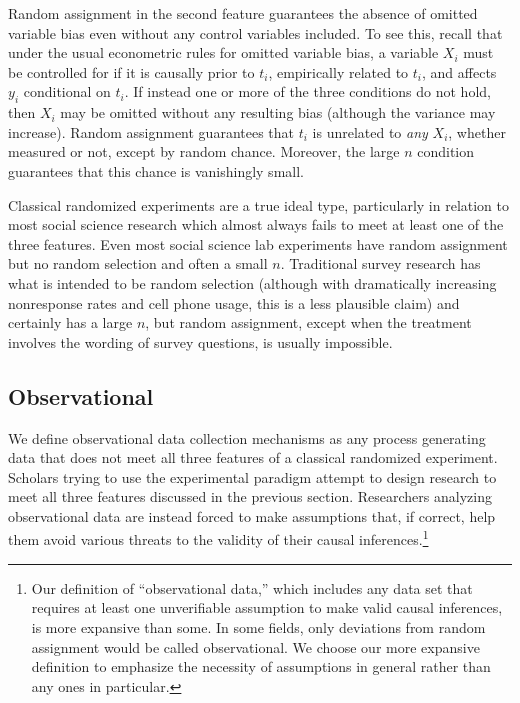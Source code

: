\documentclass[11pt,titlepage]{article}
\begin{document}
Random assignment in the second feature guarantees the absence of
omitted variable bias even without any control variables included.  To
see this, recall that under the usual econometric rules for omitted
variable bias, a variable $X_i$ must be controlled for if it is
causally prior to $t_i$, empirically related to $t_i$, and affects
$y_i$ conditional on $t_i$.  If instead one or more of the three
conditions do not hold, then $X_i$ may be omitted without any
resulting bias (although the variance may increase).  Random
assignment guarantees that $t_i$ is unrelated to \emph{any} $X_i$,
whether measured or not, except by random chance.  Moreover, the large
$n$ condition guarantees that this chance is vanishingly small.

Classical randomized experiments are a true ideal type, particularly
in relation to most social science research which almost always fails
to meet at least one of the three features.  Even most social science
lab experiments have random assignment but no random selection and
often a small $n$.  Traditional survey research has what is intended
to be random selection (although with dramatically increasing
nonresponse rates and cell phone usage, this is a less plausible
claim) and certainly has a large $n$, but random assignment, except
when the treatment involves the wording of survey questions, is
usually impossible.

\subsection{Observational}

We define observational data collection mechanisms as any process
generating data that does not meet all three features of a classical
randomized experiment.  Scholars trying to use the experimental
paradigm attempt to design research to meet all three features
discussed in the previous section.  Researchers analyzing
observational data are instead forced to make assumptions that, if
correct, help them avoid various threats to the validity of their
causal inferences.\footnote{Our definition of ``observational data,''
  which includes any data set that requires at least one unverifiable
  assumption to make valid causal inferences, is more expansive than
  some.  In some fields, only deviations from random assignment would
  be called observational.  We choose our more expansive definition to
  emphasize the necessity of assumptions in general rather than any
  ones in particular.}
\end{document}
